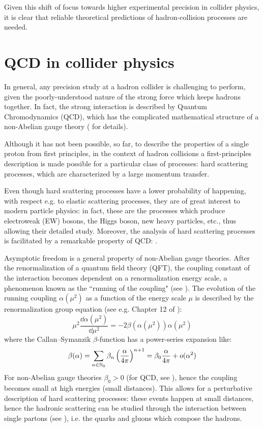 Given this shift of focus towards higher experimental precision in collider physics, it is clear that reliable theoretical predictions of hadron-collision processes are needed.

\section{QCD in collider physics}

In general, any precision study at a hadron collider is challenging to perform, given the poorly-understood nature of the strong force which keeps hadrons together. In fact, the strong interaction is described by Quantum Chromodynamics (QCD), which has the complicated mathematical structure of a non-Abelian gauge theory ( for details).

Although it has not been possible, so far, to describe the properties of a single proton from first principles, in the context of hadron collisions a first-principles description is made possible for a particular class of processes: hard scattering processes, which are characterized by a large momentum transfer.

Even though hard scattering processes have a lower probability of happening, with respect e.g. to elastic scattering processes, they are of great interest to modern particle physics: in fact, these are the processes which produce electroweak (EW) bosons, the Higgs boson, new heavy particles, etc., thus allowing their detailed study. Moreover, the analysis of hard scattering processes is facilitated by a remarkable property of QCD: .

Asymptotic freedom is a general property of non-Abelian gauge theories. After the renormalization of a quantum field theory (QFT), the coupling constant of the interaction becomes dependent on a renormalization energy scale, a phenomenon known as the ``running of the coupling" (see ). The evolution of the running coupling $ \alpha(\mu^2) $ as a function of the energy scale $ \mu $ is described by the renormalization group equation (see e.g. Chapter 12 of \cite{Peskin-1995}):
\begin{equation}
  \mu^2 \frac{\dd \alpha(\mu^2)}{\dd \mu^2} = - 2 \beta(\alpha(\mu^2)) \alpha(\mu^2)
  \label{eq:ren-gr}
\end{equation}
where the Callan--Symanzik $ \beta $-function has a power-series expansion like:
\begin{equation}
  \beta(\alpha) = \sum_{n \in \mathbb{N}_0} \beta_n \left( \frac{\alpha}{4\pi} \right)^{n+1} = \beta_0 \frac{\alpha}{4\pi} + o(\alpha^2)
  \label{eq:beta-func}
\end{equation}
For non-Abelian gauge theories $ \beta_0 > 0 $ (for QCD, see \cite{Gross-1973, Politzer-1973}), hence the coupling becomes small at high energies (small distances). This allows for a perturbative description of hard scattering processes: these events happen at small distances, hence the hadronic scattering can be studied through the interaction between single partons (see ), i.e. the quarks and gluons which compose the hadrons.

